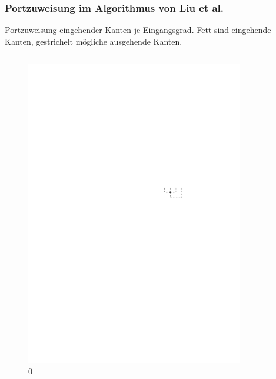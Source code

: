 \documentclass{beamer}
\begin{document}
\begin{frame}
  \frametitle{Portzuweisung im Algorithmus von Liu et al.}

Portzuweisung eingehender Kanten je Eingangsgrad. Fett sind eingehende Kanten, gestrichelt mögliche ausgehende Kanten.

\begin{columns}[b]
\begin{column}{2cm}
        \begin{figure}[h]
                \centering
                \includegraphics[scale=.8]{oc3_embed/incoming/indeg0}
                \caption{0}
        \end{figure}
\end{column}
\begin{column}{2cm}
        \begin{figure}[h]
                \centering

\end{figure}
\end{column}
\end{columns}
\end{frame}
\end{document}
